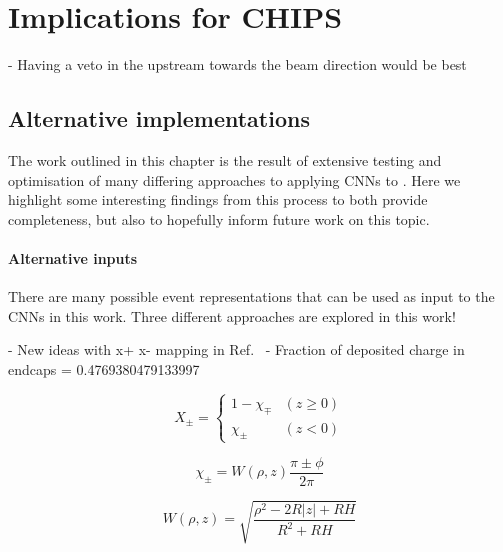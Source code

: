 \chapter{Implications for CHIPS}
\label{chap:implications}

- Having a veto in the upstream towards the beam direction would be best

\section{Alternative implementations} %
\label{sec:cvn_alt} %

The work outlined in this chapter is the result of extensive testing and optimisation of many
differing approaches to applying CNNs to \chips. Here we highlight some interesting findings from
this process to both provide completeness, but also to hopefully inform future work on this topic.

\subsubsection*{Alternative inputs} %

There are many possible event representations that can be used as input to the CNNs in this work.
Three different approaches are explored in this work!

- New ideas with x+ x- mapping in Ref.~\cite{berns2020}
- Fraction of deposited charge in endcaps = 0.4769380479133997

\begin{equation} %
    X_{\pm}=
    \begin{cases}
        1-\chi_{\mp} & (z \geq 0) \\
        \chi_{\pm}   & (z < 0)
    \end{cases}
    \label{eq:iso_case}
\end{equation}

\begin{equation} %
    \chi_{\pm}=W(\rho,z)\frac{\pi\pm\phi}{2\pi}
    \label{eq:iso_main}
\end{equation}

\begin{equation} %
    W(\rho,z)=\sqrt{\frac{\rho^{2}-2R|z|+RH}{R^{2}+RH}}
    \label{eq:iso_part}
\end{equation}

